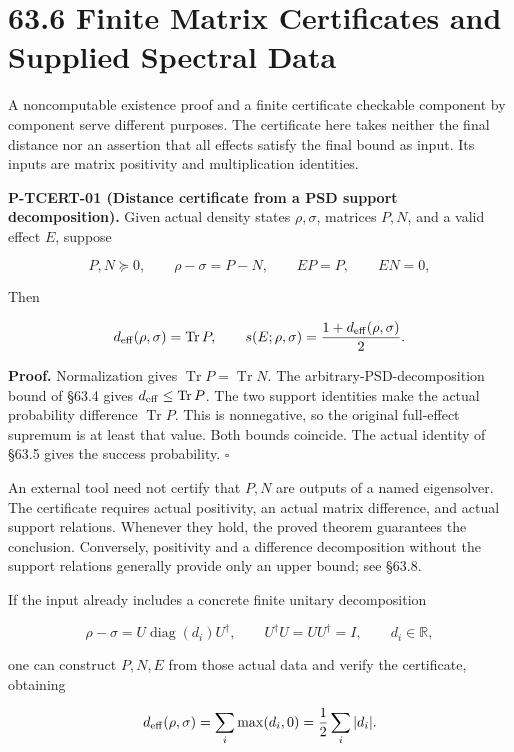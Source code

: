 \documentclass[
  11pt,
  oneside]{book}
\begin{document}
\section{63.6 Finite Matrix Certificates and Supplied Spectral Data}

A noncomputable existence proof and a finite certificate checkable
component by component serve different purposes. The certificate here
takes neither the final distance nor an assertion that all effects
satisfy the final bound as input. Its inputs are matrix positivity and
multiplication identities.

\label{p-tcert-01}{}

\textbf{P-TCERT-01 (Distance certificate from a PSD support
decomposition).} Given actual density states \(\rho,\sigma\), matrices
\(P,N\), and a valid effect \(E\), suppose

\[
P,N\succeq0,\qquad
\rho-\sigma=P-N,\qquad
EP=P,\qquad EN=0,
\]

Then

\[
d_{\rm eff}(\rho,\sigma)=\operatorname{Tr}P,
\qquad
s(E;\rho,\sigma)=\frac{1+d_{\rm eff}(\rho,\sigma)}2.
\]

\textbf{Proof.} Normalization gives
\(\operatorname{Tr}P=\operatorname{Tr}N\). The
arbitrary-PSD-decomposition bound of §63.4 gives
\(d_{\rm eff}\le\operatorname{Tr}P\). The two support identities make
the actual probability difference \(\operatorname{Tr}P\). This is
nonnegative, so the original full-effect supremum is at least that
value. Both bounds coincide. The actual identity of §63.5 gives the
success probability. \(\square\)

An external tool need not certify that \(P,N\) are outputs of a named
eigensolver. The certificate requires actual positivity, an actual
matrix difference, and actual support relations. Whenever they hold, the
proved theorem guarantees the conclusion. Conversely, positivity and a
difference decomposition without the support relations generally provide
only an upper bound; see §63.8.

If the input already includes a concrete finite unitary decomposition

\[
\rho-\sigma=U\operatorname{diag}(d_i)U^\dagger,
\qquad U^\dagger U=UU^\dagger=I,
\qquad d_i\in\mathbb R,
\]

one can construct \(P,N,E\) from those actual data and verify the
certificate, obtaining

\[
d_{\rm eff}(\rho,\sigma)
=\sum_i\max(d_i,0)
=\frac12\sum_i|d_i|.
\]
\end{document}
